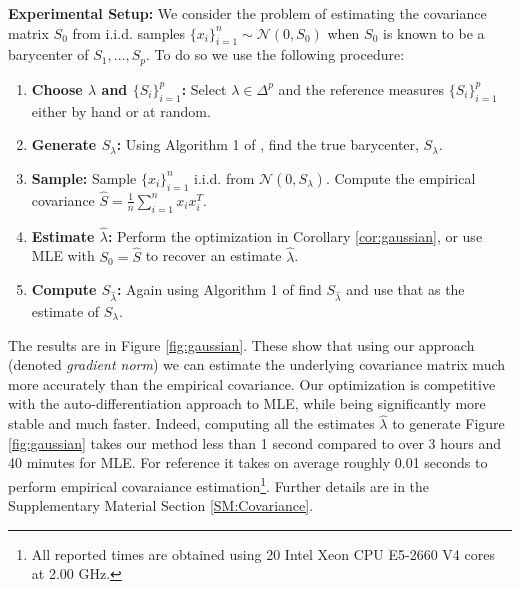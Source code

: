 \documentclass[nohyperref]{article}
\theoremstyle{definition}
\begin{document}
\textbf{Experimental Setup:}  We consider the problem of estimating the covariance matrix $S_0$ from i.i.d. samples $\{x_i\}_{i=1}^{n} \sim \mathcal{N}(0,S_0)$ when $S_0$ is known to be a barycenter of $S_1,...,S_p$. To do so we use the following procedure:
\vspace{-5pt}
\begin{enumerate}
\setlength \itemsep{-4pt}
    \item \textbf{Choose $\lambda$ and $\{S_i\}_{i=1}^p$:} Select $\lambda \in \Delta^p$ and the reference measures $\{S_{i}\}_{i=1}^{p}$ either by hand or at random.
    \item \textbf{Generate $S_{\lambda}$:} Using Algorithm 1 of \citep{chewi2020gradient}, find the true barycenter, $S_{\lambda}$.
    \item \textbf{Sample:} Sample $\{x_i\}_{i=1}^n$ i.i.d. from $\mathcal{N}(0,S_{\lambda})$. Compute the empirical covariance
    $\hat{S} = \frac{1}{n} \sum_{i=1}^n x_ix_i^T.$
    \item \textbf{Estimate $\hat{\lambda}$:} Perform the optimization in Corollary \ref{cor:gaussian}, or use MLE with $S_0 = \hat{S}$ to recover an estimate $\hat{\lambda}$.
    \item \textbf{Compute $S_{\hat{\lambda}}$:} Again using Algorithm 1 of \citep{chewi2020gradient} find $S_{\hat{\lambda}}$ and use that as the estimate of $S_{\lambda}$.
\end{enumerate}
The results are in Figure \ref{fig:gaussian}. These show that using our approach (denoted \emph{gradient norm}) we can estimate the underlying covariance matrix much more accurately than the empirical covariance. Our optimization is competitive with the auto-differentiation approach to MLE, while being significantly more stable and much faster.  Indeed, computing all the estimates $\hat{\lambda}$ to generate Figure \ref{fig:gaussian} takes our method less than 1 second compared to over 3 hours and 40 minutes for MLE. For reference it takes on average roughly 0.01 seconds to perform empirical covaraiance estimation\footnote{All reported times are obtained using 20 Intel Xeon CPU E5-2660 V4 cores at 2.00 GHz.}. Further details are in the Supplementary Material Section \ref{SM:Covariance}.

\end{document}
